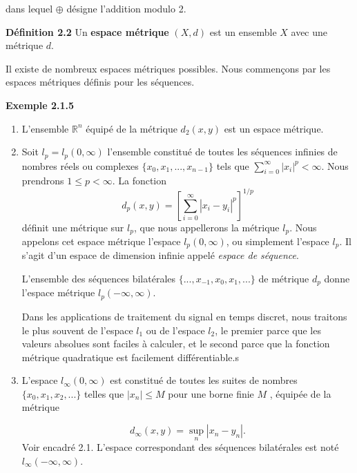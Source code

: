 \documentclass[10pt,twoside,a4paper]{book}
\begin{document}
\noindent
dans lequel $\oplus$ désigne l'addition modulo 2.


\vspace{4mm}
\noindent
\textbf{Définition 2.2} Un \textbf{espace métrique} $(X, d)$ est un ensemble $X$ avec une métrique $d$.

\noindent
Il existe de nombreux espaces métriques possibles. Nous commençons par les espaces métriques définis pour les séquences.

\vspace{4mm}
\noindent
\textbf{Exemple 2.1.5}
\begin{enumerate}
  \item L'ensemble $\mathbb{R}^n$ équipé de la métrique $d_2(x, y)$ est un espace métrique.
  \item Soit $l_p = l_p(0, \infty)$ l'ensemble constitué de toutes les séquences infinies de nombres réels ou complexes $\{x_0, x_1,...,x_{n-1}\}$ tels que
  $\sum_{i=0}^{\infty} |x_i|^p < \infty$. Nous prendrons $1 \leq p < \infty$. La fonction
  \begin{equation*}
    d_p(x, y) = \left[{\sum_{i=0}^{\infty} |x_i - y_i|^p}\right]^{1/p}
  \end{equation*}
  \noindent
  définit une métrique sur $l_p$, que nous appellerons la métrique $l_p$. Nous appelons cet espace métrique l'espace $l_p(0, \infty)$, ou simplement l'espace $l_p$. 
  Il s'agit d'un espace de dimension infinie appelé \textit{espace de séquence}.

  L'ensemble des séquences bilatérales $\{...,x_{-1}, x_0, x_1,...\}$ de métrique $d_p$ donne l'espace métrique $l_p(-\infty, \infty)$.

  Dans les applications de traitement du signal en temps discret, nous traitons le plus souvent de l'espace $l_1$ ou de l'espace $l_2$, le premier parce que les valeurs absolues sont faciles à calculer, et le second parce que la fonction métrique quadratique est facilement différentiable.s
  \item L'espace $l_\infty(0, \infty)$ est constitué de toutes les suites de nombres $\{x_0, x_1, x_2,...\}$ telles que $|x_n| \leq M$ pour une borne finie $M$ , équipée de la métrique
  
  \begin{equation}
    d_\infty(x, y) = \sup\limits_n |x_n - y_n| .
  \end{equation}
  \noindent
  Voir encadré 2.1. L'espace correspondant des séquences bilatérales est noté $l_\infty(-\infty, \infty)$.
\end{enumerate}
\end{document}
